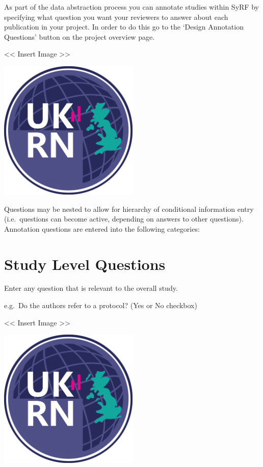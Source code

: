 \documentclass[]{book}
\begin{document}
As part of the data abstraction process you can annotate studies within
SyRF by specifying what question you want your reviewers to answer about
each publication in your project. In order to do this go to the `Design
Annotation Questions' button on the project overview page.

\textless{}\textless{} Insert Image \textgreater{}\textgreater{}

\includegraphics[width=0.50000\textwidth,height=0.50000\textwidth]{figs/evidence-triangle.png}

Questions may be nested to allow for hierarchy of conditional
information entry (i.e.~questions can become active, depending on
answers to other questions). Annotation questions are entered into the
following categories:

\section{Study Level Questions}\label{study-level-questions}

Enter any question that is relevant to the overall study.

e.g.~Do the authors refer to a protocol? (Yes or No checkbox)

\textless{}\textless{} Insert Image \textgreater{}\textgreater{}

\includegraphics[width=0.50000\textwidth,height=0.50000\textwidth]{figs/evidence-triangle.png}
\end{document}
